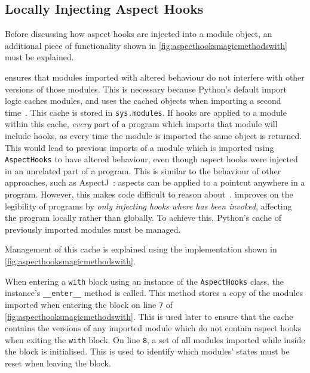 \subsection{Locally Injecting Aspect Hooks}
\label{local_aspect_hook_effects}

Before discussing how aspect hooks are injected into a module object, an
additional piece of functionality shown in
\cref{fig:aspecthooksmagicmethodswith} must be explained.

\pdsfthree{} ensures that modules imported with altered behaviour do not interfere
with other versions of those modules. This is necessary because Python's default
import logic caches modules, and uses the cached objects when importing a second
time~\cite{python_import_cache_definition}. This cache is stored in
\lstinline{sys.modules}. If hooks are applied to a module within this cache,
\emph{every} part of a program which imports that module will include hooks, as
every time the module is imported the same object is returned. This would lead
to previous imports of a module which is imported using \lstinline{AspectHooks}
to have altered behaviour, even though aspect hooks were injected in an
unrelated part of a program. This is similar to the behaviour of other \aop{}
approaches, such as AspectJ~\cite{AspectJLanguageAndTools}: aspects can be
applied to a pointcut anywhere in a program. However, this makes code difficult
to reason about~\cite{steimann06paradoxical,przybylek2010wrong}. \pdsfthree{}
improves on the legibility of \aspectoriented programs by \emph{only injecting
hooks where \pdsfthree{} has been invoked}, affecting the program locally rather than
globally. To achieve this, Python's cache of previously imported modules must be
managed.

Management of this cache is explained using the implementation shown in
\cref{fig:aspecthooksmagicmethodswith}.

When entering a \lstinline{with} block using an instance of the
\lstinline{AspectHooks} class, the instance's \lstinline{__enter__} method is
called. This method stores a copy of the modules imported when entering the
block on line \texttt{7} of \cref{fig:aspecthooksmagicmethodswith}. This is used
later to ensure that the cache contains the versions of any imported module
which do not contain aspect hooks when exiting the \lstinline{with} block. On
line \texttt{8}, a set of all modules imported while inside the block is
initialised. This is used to identify which modules' states must be reset when
leaving the block.

